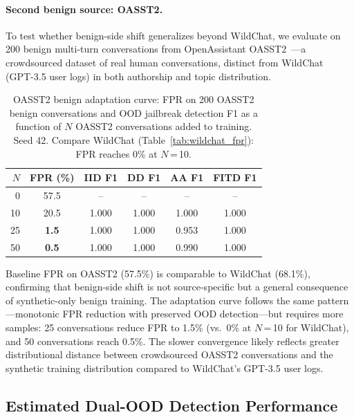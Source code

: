 \paragraph{Second benign source: OASST2.}
\label{app:oasst2}

To test whether benign-side shift generalizes beyond WildChat, we evaluate on 200 benign multi-turn conversations from OpenAssistant OASST2~\citep{kopf2023openassistant}---a crowdsourced dataset of real human conversations, distinct from WildChat (GPT-3.5 user logs) in both authorship and topic distribution.

\begin{table}[ht]
\centering
\footnotesize
\caption{OASST2 benign adaptation curve: FPR on 200 OASST2 benign conversations and OOD jailbreak detection F1 as a function of $N$ OASST2 conversations added to training. Seed 42. Compare WildChat (Table~\ref{tab:wildchat_fpr}): FPR reaches 0\% at $N$\,=\,10.}
\label{tab:oasst2_curve}
\begin{tabular}{@{}rccccc@{}}
\toprule
$N$ & FPR (\%) & IID F1 & DD F1 & AA F1 & FITD F1 \\
\midrule
0 & 57.5 & -- & -- & -- & -- \\
10 & 20.5 & 1.000 & 1.000 & 1.000 & 1.000 \\
25 & \textbf{1.5} & 1.000 & 1.000 & 0.953 & 1.000 \\
50 & \textbf{0.5} & 1.000 & 1.000 & 0.990 & 1.000 \\
\bottomrule
\end{tabular}
\end{table}

Baseline FPR on OASST2 (57.5\%) is comparable to WildChat (68.1\%), confirming that benign-side shift is not source-specific but a general consequence of synthetic-only benign training. The adaptation curve follows the same pattern---monotonic FPR reduction with preserved OOD detection---but requires more samples: 25 conversations reduce FPR to 1.5\% (vs.\ 0\% at $N$\,=\,10 for WildChat), and 50 conversations reach 0.5\%. The slower convergence likely reflects greater distributional distance between crowdsourced OASST2 conversations and the synthetic training distribution compared to WildChat's GPT-3.5 user logs.

\subsection{Estimated Dual-OOD Detection Performance}
\label{app:dual_ood}

